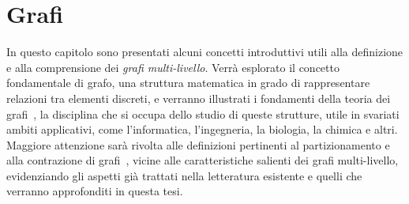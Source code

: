 \chapter{Grafi}\label{cap:grafi-e-approccio-multi-livello}

In questo capitolo sono presentati alcuni concetti introduttivi utili alla definizione e alla comprensione dei
\textit{grafi multi-livello}.
Verr\`a esplorato il concetto fondamentale di grafo, una struttura matematica in grado di rappresentare relazioni tra
elementi discreti, e verranno illustrati i fondamenti della teoria dei grafi~\cite{cormen2010introduction,gross2018graph},
la disciplina che si occupa dello studio di queste strutture, utile in svariati ambiti applicativi, come l'informatica,
l'ingegneria, la biologia, la chimica e altri.
Maggiore attenzione sar\`a rivolta alle definizioni pertinenti al partizionamento e alla contrazione di
grafi~\cite{Sanders2012HighQG}, vicine alle caratteristiche salienti dei grafi multi-livello,
evidenziando gli aspetti gi\`a trattati nella letteratura esistente e quelli che verranno approfonditi in questa tesi.









